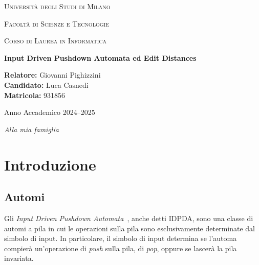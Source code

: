\documentclass[a4paper,12pt]{report}
\theoremstyle{propositionstyle}
\begin{document}
    \begin{titlepage}
        \centering
        {\scshape\LARGE Università degli Studi di Milano \par}
        \vspace{1cm}
        {\scshape\Large Facoltà di Scienze e Tecnologie \par}
        \vspace{0.5cm}
        {\scshape\large Corso di Laurea in Informatica\par}
        \vspace{2cm}
        {\huge\bfseries Input Driven Pushdown Automata ed Edit Distances\par}
        \vspace{2cm}
        \begin{flushleft}
            \textbf{Relatore:} Giovanni Pighizzini\\
            \textbf{Candidato:} Luca Casnedi\\
            \textbf{Matricola:} 931856
        \end{flushleft}
        \vfill
        {\large Anno Accademico 2024--2025\par}
    \end{titlepage}

    \cleardoublepage
    \thispagestyle{empty}
    \vspace*{\fill}
    \begin{flushright}
    \small \textit{Alla mia famiglia}
    \end{flushright}
    \cleardoublepage

    \setcounter{tocdepth}{3}
    \tableofcontents
    \clearpage



    \chapter{Introduzione}


    \section{Automi}

    Gli \emph{Input Driven Pushdown Automata}~\cite{okhotin-salomaa}, anche detti IDPDA, sono una classe di automi a pila in cui le operazioni sulla pila sono esclusivamente determinate dal simbolo di input.
    In particolare, il simbolo di input determina se l'automa compierà un'operazione di \emph{push} sulla pila, di \emph{pop}, oppure se lascerà la pila invariata.
\end{document}
